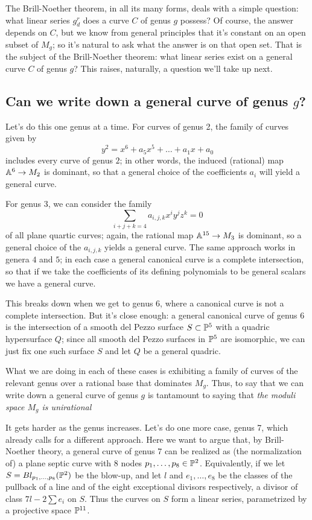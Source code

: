 The Brill-Noether theorem, in all its many forms, deals with a simple question: what linear series $g^r_d$ does a curve $C$ of genus $g$ possess? Of course, the answer depends on $C$, but we know from general principles that it's constant on an open subset of $M_g$; so it's natural to ask what the answer is on that open set. That is the subject of the Brill-Noether theorem: what linear series exist on a general curve $C$ of genus $g$? This raises, naturally, a question we'll take up next.

\subsection{Can we write down a general curve of genus $g$?}

Let's do this one genus at a time. For curves of genus 2, the family of curves given by
$$
y^2 = x^6 + a_5x^5 + \dots + a_1x + a_0
$$
includes every curve of genus $2$; in other words, the induced (rational) map $\AA^6 \to M_2$ is dominant, so that  a general choice of the coefficients $a_i$ will yield a general curve.

For genus 3, we can consider the family
$$
\sum_{i+j+k = 4} a_{i,j,k}x^i y^jz^k = 0
$$
of all plane quartic curves; again, the rational map $\AA^{15} \to M_3$ is dominant, so a general choice of the $a_{i,j,k}$ yields a general curve. The same approach works in genera $4$ and $5$; in each case a general canonical curve is a complete intersection, so that if we take the coefficients of its defining polynomials to be general scalars we have a general curve.

This breaks down when we get to genus 6, where a canonical curve is not a complete intersection. But it's close enough: a general canonical curve of genus 6 is the intersection of a smooth del Pezzo surface $S \subset \PP^5$ with a quadric hypersurface $Q$; since all smooth del Pezzo surfaces in $\PP^5$ are isomorphic, we can just fix one such surface $S$ and let $Q$ be a general quadric.

What we are doing in each of these cases is exhibiting a family of curves of the relevant genus over a rational base that dominates $M_g$. Thus, to say that we can write down a general curve of genus $g$ is tantamount to saying that \emph{the moduli space $M_g$ is unirational}

It gets harder as the genus increases. Let's do one more case, genus 7, which already calls for a different approach. Here we want to argue that, by Brill-Noether theory, a general curve of genus $7$ can be realized as (the normalization of) a plane septic curve with 8 nodes $p_1,\dots,p_8 \in \PP^2$. Equivalently, if we let $S = Bl_{p_1,\dots,p_8}(\PP^2)$ be the blow-up, and let $l$ and $e_1,\dots,e_8$ be the classes of the pullback of a line and of the eight exceptional divisors respectively, a divisor of class $7l - 2 \sum e_i$ on $S$. Thus the curves on $S$ form a linear series, parametrized by a projective space $\PP^{11}$.


